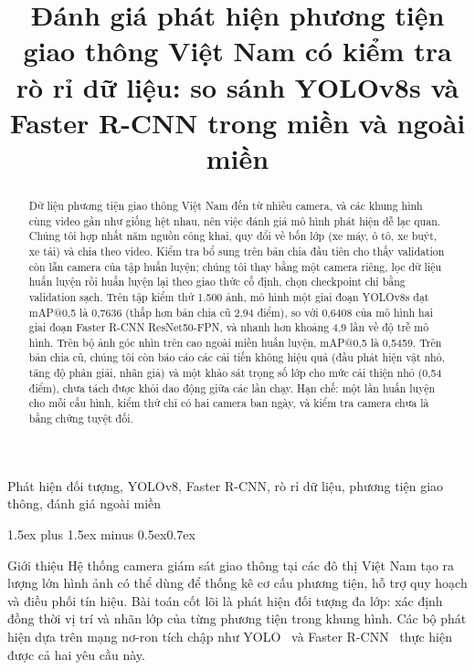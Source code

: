 \documentclass[10pt,journal,letterpaper]{IEEEtran}
\makeatletter
\renewcommand\section{\@startsection{section}{1}{\z@}%
  {1.5ex plus 1.5ex minus 0.5ex}{0.7ex}{\normalfont\scshape\raggedright}}
\makeatother
\begin{document}
\title{Đánh giá phát hiện phương tiện giao thông Việt Nam có kiểm tra rò rỉ dữ liệu: so sánh YOLOv8s và Faster R-CNN trong miền và ngoài miền}

\author{
}

\maketitle

\begin{abstract}
Dữ liệu phương tiện giao thông Việt Nam đến từ nhiều camera, và các khung hình cùng video gần như giống hệt nhau, nên việc đánh giá mô hình phát hiện dễ lạc quan. Chúng tôi hợp nhất năm nguồn công khai, quy đổi về bốn lớp (xe máy, ô tô, xe buýt, xe tải) và chia theo video. Kiểm tra bổ sung trên bản chia đầu tiên cho thấy validation còn lẫn camera của tập huấn luyện; chúng tôi thay bằng một camera riêng, lọc dữ liệu huấn luyện rồi huấn luyện lại theo giao thức cố định, chọn checkpoint chỉ bằng validation sạch. Trên tập kiểm thử 1.500 ảnh, mô hình một giai đoạn YOLOv8s đạt mAP@0,5 là 0,7636 (thấp hơn bản chia cũ 2,94 điểm), so với 0,6408 của mô hình hai giai đoạn Faster R-CNN ResNet50-FPN, và nhanh hơn khoảng 4,9 lần về độ trễ mô hình. Trên bộ ảnh góc nhìn trên cao ngoài miền huấn luyện, mAP@0,5 là 0,5459. Trên bản chia cũ, chúng tôi còn báo cáo các cải tiến không hiệu quả (đầu phát hiện vật nhỏ, tăng độ phân giải, nhãn giả) và một khảo sát trọng số lớp cho mức cải thiện nhỏ (0,54 điểm), chưa tách được khỏi dao động giữa các lần chạy. Hạn chế: một lần huấn luyện cho mỗi cấu hình, kiểm thử chỉ có hai camera ban ngày, và kiểm tra camera chưa là bằng chứng tuyệt đối.
\end{abstract}

\begin{IEEEkeywords}
Phát hiện đối tượng, YOLOv8, Faster R-CNN, rò rỉ dữ liệu, phương tiện giao thông, đánh giá ngoài miền
\end{IEEEkeywords}

\section{Giới thiệu}
Hệ thống camera giám sát giao thông tại các đô thị Việt Nam tạo ra lượng lớn hình ảnh có thể dùng để thống kê cơ cấu phương tiện, hỗ trợ quy hoạch và điều phối tín hiệu. Bài toán cốt lõi là phát hiện đối tượng đa lớp: xác định đồng thời vị trí và nhãn lớp của từng phương tiện trong khung hình. Các bộ phát hiện dựa trên mạng nơ-ron tích chập như YOLO~\cite{yolo} và Faster R-CNN~\cite{frcnn} thực hiện được cả hai yêu cầu này.
\end{document}
